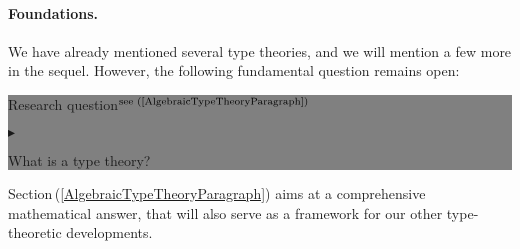 \documentclass[11pt,twocolumn]{article}
\newenvironment{btritemize}
  {\begin{list}{\btr}
  {\setlength{\topsep}{2pt}
   \setlength{\partopsep}{2pt}
   \setlength{\itemsep}{2.5pt}
   \setlength{\parsep}{2.5pt}
   \setlength{\leftmargin}{1em}
   \setlength{\labelwidth}{.5em}}}
  {\end{list}}
\newcommand{\mytextsf}[1]{\textsf{\small #1}}
\newcommand{\hide}[1]{}
\newcommand{\pref}[1]{\,(\ref{#1})}
\newcommand{\btr}{$\blacktriangleright$}
\newcommand{\reqpsize}{8.113395cm}%
\newcommand{\req}[2]{\begin{center}\colorbox{grey}{\begin{minipage}{\reqpsize} 
  \mytextsf{Research question}\hfill$^{\mbox{\scriptsize see #1 }}$\\[-5.5mm]
  \begin{btritemize}
  \item #2
  \end{btritemize}
\end{minipage}}\end{center}}
\begin{document}
\setcounter{paragraph}{0}
\paragraph{Foundations.}

We have already mentioned several type theories, and we will mention a few
more in the sequel.  However, the following fundamental question
remains open:
\req{(\ref{AlgebraicTypeTheoryParagraph})}
{What is a type theory?}

Section\pref{AlgebraicTypeTheoryParagraph} aims at a comprehensive
mathematical answer, that will also serve as a framework for our other
type-theoretic developments.  
\hide{
  We regard this as a step towards the related open question:
\req{}{What is a programming language?}
that will be kept in the background of our investigations.
}
\end{document}
